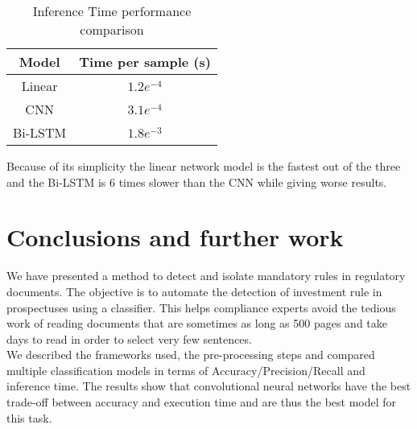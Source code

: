 \documentclass[11pt,a4paper]{article}
\begin{document}





\begin{table}[h!]
    \centering
    \begin{tabular}{c|c}
         \textbf{Model}& \textbf{Time per sample (s)}\\
         \hline
         Linear&\textbf{$1.2e^{-4}$}\\
         CNN&$3.1e^{-4}$\\
         Bi-LSTM&$1.8e^{-3}$\\
         \hline
    \end{tabular}
    \caption{Inference Time performance comparison}
    \label{tab:results-inference-time}
\end{table}

Because of its simplicity the linear network model is the fastest out of the three and the Bi-LSTM is 6 times slower than the CNN while giving worse results.

\section{Conclusions and further work}\label{conclusion}

We have presented a method to detect and isolate mandatory rules in regulatory documents. The objective is to automate the detection of investment rule in prospectuses using a classifier. This helps compliance experts avoid the tedious work of reading documents that are sometimes as long as 500 pages and take days to read in order to select very few sentences.\\
We described the frameworks used, the pre-processing steps and compared multiple classification models in terms of Accuracy/Precision/Recall and inference time. The results show that convolutional neural networks have the best trade-off between accuracy and execution time and are thus the best model for this task.





\end{document}
